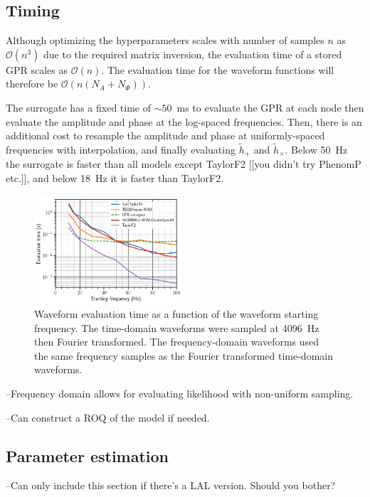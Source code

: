 \documentclass[prd,aps,letter,twocolumn,floatfix,notitlepage,nofootinbib]{revtex4-1}
\begin{document}
\subsection{Timing}

Although optimizing the hyperparameters scales with number of samples $n$ as $\mathcal{O}(n^3)$
due to the required matrix inversion, the evaluation time of a stored GPR scales as $\mathcal{O}(n)$.
The evaluation time for the waveform functions will therefore be $\mathcal{O}(n(N_A+N_\Phi))$.

The surrogate has a fixed time of $\sim 50$~ms to evaluate the GPR at each node then evaluate the amplitude
and phase at the log-spaced frequencies. Then, there is an additional cost to resample the amplitude and phase
at uniformly-spaced frequencies with interpolation, and finally evaluating $\tilde h_+$ and $\tilde h_\times$. 
Below 50~Hz the surrogate is faster than all models except TaylorF2 [[you didn't try PhenomP etc.]], and below
18~Hz it is faster than TaylorF2. 

\begin{figure}[htb]
\centering
\includegraphics[width=0.49\textwidth]{timing.png}
\caption{Waveform evaluation time as a function of the waveform starting frequency. The time-domain waveforms
were sampled at 4096~Hz then Fourier transformed. The frequency-domain waveforms used the
same frequency samples as the Fourier transformed time-domain waveforms.}
\label{fig:timing}
\end{figure}

--Frequency domain allows for evaluating likelihood with non-uniform sampling.

--Can construct a ROQ of the model if needed.

\subsection{Parameter estimation}

--Can only include this section if there's a LAL version. Should you bother?
\end{document}

